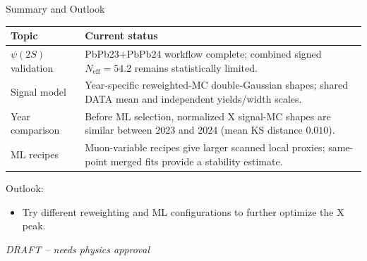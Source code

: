 \begin{frame}[label=p16]{Summary and Outlook}
  \small
  \vspace{4pt}
  \begin{center}
    \renewcommand{\arraystretch}{1.12}
    \setlength{\tabcolsep}{6pt}
    \begin{tabular}{p{}p{}}
      \toprule
      Topic & Current status \\
      \midrule
      $\psi(2S)$ validation & PbPb23$+$PbPb24 workflow complete; combined signed $N_{\mathrm{eff}}=54.2$ remains statistically limited. \\
      Signal model & Year-specific reweighted-MC double-Gaussian shapes; shared DATA mean and independent yields/width scales. \\
      Year comparison & Before ML selection, normalized X signal-MC shapes are similar between 2023 and 2024 (mean KS distance $0.010$). \\
      ML recipes & Muon-variable recipes give larger scanned local proxies; same-point merged fits provide a stability estimate. \\
      \bottomrule
    \end{tabular}
  \end{center}

  \vspace{0.15em}
  Outlook:
  \begin{itemize}
    \setlength{\itemsep}{0.08em}
    \item Try different reweighting and ML configurations to further optimize the X peak.
  \end{itemize}

  \vfill
  \centering
  \textit{DRAFT -- needs physics approval}
\end{frame}

\begin{frame}[plain,label=p17]{\strut}
  \centering
  \vfill
  \vfill
\end{frame}
